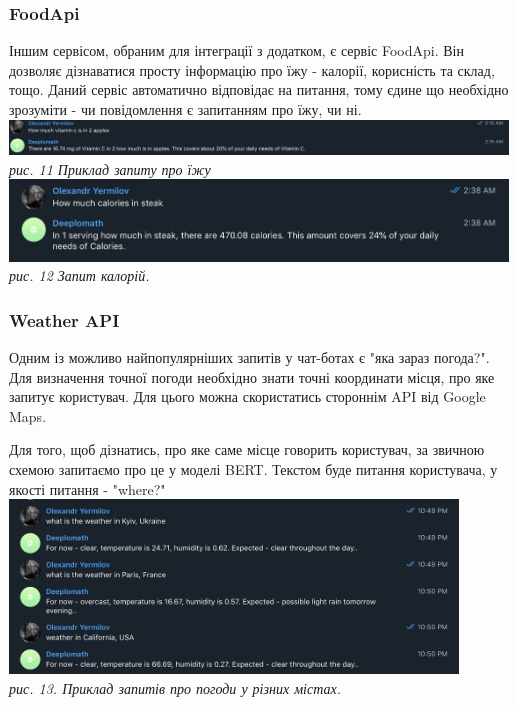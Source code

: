 \subsubsection{FoodApi}
Іншим сервісом, обраним для інтеграції з додатком, є сервіс FoodApi. Він дозволяє дізнаватися просту інформацію про їжу - калорії, корисність та склад, тощо. Даний сервіс автоматично відповідає на питання, тому єдине що необхідно зрозуміти - чи повідомлення є запитанням про їжу, чи ні.
\includegraphics[width = 500]{Dissertation/food_api.png}\\
\textit{рис. 11 Приклад запиту про їжу}\\
\includegraphics[width = 500]{Dissertation/foodapi2.png}\\
\textit{рис. 12 Запит калорій.}

\subsubsection{Weather API}

Одним із можливо найпопулярніших запитів у чат-ботах є "яка зараз погода?". Для визначення точної погоди необхідно знати точні координати місця, про яке запитує користувач. Для цього можна скористатись стороннім API від Google Maps. 

Для того, щоб дізнатись, про яке саме місце говорить користувач, за звичною схемою запитаємо про це у моделі BERT. Текстом буде питання користувача, у якості питання - "where?" \\
\includegraphics[width = 450]{Dissertation/weather1.png}\\
\textit{рис. 13. Приклад запитів про погоди у різних містах.}

